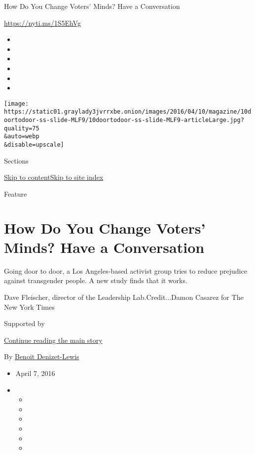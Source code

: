 How Do You Change Voters' Minds? Have a Conversation

\url{https://nyti.ms/1S5EhVg}

\begin{itemize}
\item
\item
\item
\item
\item
\item
\end{itemize}

\texttt{[image: https://static01.graylady3jvrrxbe.onion/images/2016/04/10/magazine/10doortodoor-ss-slide-MLF9/10doortodoor-ss-slide-MLF9-articleLarge.jpg?quality=75\\\&auto=webp\\\&disable=upscale]}

Sections

\protect\hyperlink{site-content}{Skip to
content}\protect\hyperlink{site-index}{Skip to site index}

Feature

\hypertarget{how-do-you-change-voters-minds-have-a-conversation}{%
\section{How Do You Change Voters' Minds? Have a
Conversation}\label{how-do-you-change-voters-minds-have-a-conversation}}

Going door to door, a Los Angeles-based activist group tries to reduce
prejudice against transgender people. A new study finds that it works.

Dave Fleischer, director of the Leadership Lab.Credit...Damon Casarez
for The New York Times

Supported by

\protect\hyperlink{after-sponsor}{Continue reading the main story}

By
\href{https://www.nytimes3xbfgragh.onion/by/benoit-denizet-lewis}{Benoit
Denizet-Lewis}

\begin{itemize}
\item
  April 7, 2016
\item
  \begin{itemize}
  \item
  \item
  \item
  \item
  \item
  \item
  \end{itemize}
\end{itemize}

